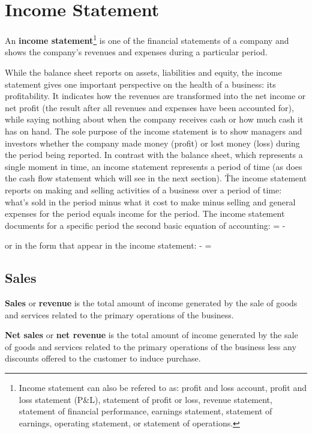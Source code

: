 \section{Income Statement}

An \textbf{income statement}\footnote{Income statement can also be refered to as: profit and loss account, profit
and loss statement (P\&L), statement of profit or loss, revenue statement, statement of financial performance,
earnings statement, statement of earnings, operating statement, or statement of operations.} is one of the financial
statements of a company and shows the company's revenues and expenses during a particular period.
\ed

While the balance sheet reports on assets, liabilities and equity, the income statement gives one important
perspective on the health of a business: its profitability. It indicates how the revenues are transformed into the
net income or net profit (the result after all revenues and expenses have been accounted for), while saying nothing
about when the company receives cash or how much cash it has on hand. The sole purpose of the income statement is to
show managers and investors whether the company made money (profit) or lost money (loss) during the period being
reported. In contrast with the balance sheet, which represents a single moment in time, an income statement
represents a period of time (as does the cash flow statement which will see in the next section). \v

The income statement reports on making and selling activities of a business over a period of time: what's sold in the
period minus what it cost to make minus selling and general expenses for the period equals income for the period. The
income statement documents for a specific period the second basic equation of accounting:
\bse
{} =  - 
\ese

or in the form that appear in the income statement:
\bse
{} -  = 
\ese

\subsection{Sales}

\textbf{Sales} or \textbf{revenue} is the total amount of income generated by the sale of goods and services related to the
primary operations of the business.
\ed

\textbf{Net sales} or \textbf{net revenue} is the total amount of income generated by the sale of goods and services
related to the primary operations of the business less any discounts offered to the customer to induce purchase.
\ed

